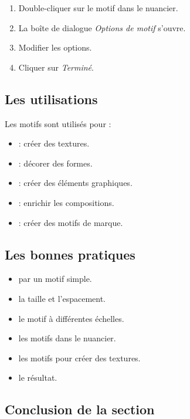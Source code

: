 \begin{enumerate}
    \item Double-cliquer sur le motif dans le nuancier.
    \item La boîte de dialogue \emph{Options de motif} s'ouvre.
    \item Modifier les options.
    \item Cliquer sur \emph{Terminé}.
\end{enumerate}

\subsection{Les utilisations}

Les motifs sont utilisés pour :

\begin{itemize}
    \item {} : créer des textures.
    \item {} : décorer des formes.
    \item {} : créer des éléments graphiques.
    \item {} : enrichir les compositions.
    \item {} : créer des motifs de marque.
\end{itemize}

\subsection{Les bonnes pratiques}

\begin{itemize}
    \item {} par un motif simple.
    \item {} la taille et l'espacement.
    \item {} le motif à différentes échelles.
    \item {} les motifs dans le nuancier.
    \item {} les motifs pour créer des textures.
    \item {} le résultat.
\end{itemize}

\subsection*{Conclusion de la section}

